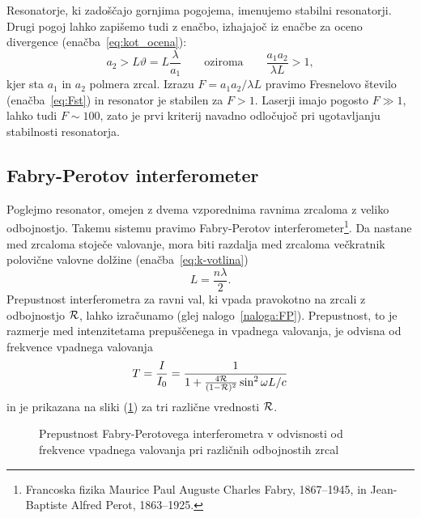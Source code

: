 Resonatorje, ki zadoščajo gornjima pogojema, imenujemo stabilni 
resonatorji.
Drugi pogoj lahko zapišemo tudi z enačbo, izhajajoč iz enačbe za oceno divergence (enačba~\ref{eq:kot_ocena}):
\begin{equation}
a_2 > L \vartheta = L\frac{\lambda}{a_1}\qquad \mathrm{oziroma} \qquad
\frac{a_{1}a_{2}}{\lambda L}>1,
\label{eq:Fresnelovo_stevilo}
\end{equation}
kjer sta $a_{1}$ in $a_{2}$ polmera zrcal. Izrazu 
$
F = a_{1}a_{2}/\lambda L
$
pravimo Fresnelovo število (enačba~\ref{eq:Fst})
in resonator je stabilen za $F>1$. Laserji imajo pogosto $F\gg 1$, lahko tudi $F \sim 100$, zato je 
prvi kriterij navadno odločujoč pri ugotavljanju stabilnosti resonatorja.

\subsection*{Fabry-Perotov interferometer}
Poglejmo resonator, omejen z dvema vzporednima ravnima zrcaloma
z veliko odbojnostjo. Takemu sistemu pravimo Fabry-Perotov 
interferometer\footnote{Francoska fizika Maurice Paul Auguste Charles Fabry, 1867--1945, in 
Jean-Baptiste Alfred Perot, 1863--1925.}. 
Da nastane med zrcaloma stoječe valovanje, mora biti razdalja 
med zrcaloma večkratnik polovične valovne dolžine (enačba~\ref{eq:k-votlina})
\begin{equation}
L = \frac{n \lambda}{2}.
\end{equation}
Prepustnost interferometra za ravni val, ki vpada pravokotno na zrcali z
odbojnostjo ${\cal R}$, lahko izračunamo (glej nalogo~\ref{naloga:FP}). Prepustnost, to je 
razmerje med intenzitetama prepuščenega in vpadnega valovanja, je odvisna
od  frekvence vpadnega valovanja
\begin{equation}
T=\frac{I}{I_0} = \frac{1}{1+\frac{4{\cal R}}{(1-{\cal R})^{2}}\sin^{2}\omega L/c}
\label{eq:Fabry-Perot-prepustnost}
\end{equation}
in je prikazana na sliki (\ref{fig:Fabry-Perot}) za tri različne vrednosti ${\cal R}$.
\begin{figure}[h!]
\centering
\def\svgwidth{95truemm} 

\caption{
Prepustnost Fabry-Perotovega interferometra
v odvisnosti od frekvence vpadnega valovanja pri različnih odbojnostih zrcal}
\label{fig:Fabry-Perot}
\end{figure}


